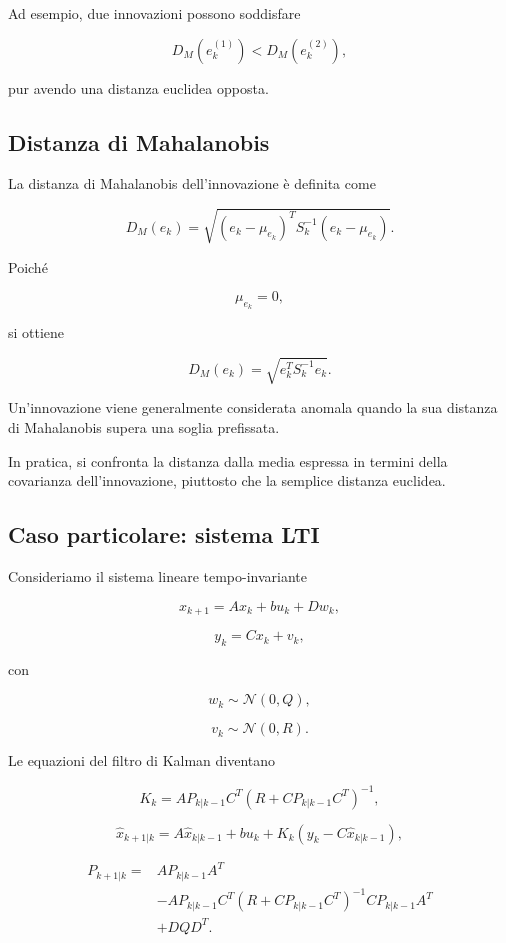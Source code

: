 \documentclass[11pt,a4paper]{article}
\begin{document}
Ad esempio, due innovazioni possono soddisfare

\[
D_M(e_k^{(1)})
<
D_M(e_k^{(2)}),
\]

pur avendo una distanza euclidea opposta.

\subsection*{Distanza di Mahalanobis}

La distanza di Mahalanobis dell'innovazione è definita come

\[
\boxed{
D_M(e_k)
=
\sqrt{
(e_k-\mu_{e_k})^T
S_k^{-1}
(e_k-\mu_{e_k})
}.
}
\]

Poiché

\[
\mu_{e_k}=0,
\]

si ottiene

\[
\boxed{
D_M(e_k)
=
\sqrt{
e_k^TS_k^{-1}e_k
}.
}
\]

Un'innovazione viene generalmente considerata anomala quando la sua distanza di Mahalanobis supera una soglia prefissata.

In pratica, si confronta la distanza dalla media espressa in termini della covarianza dell'innovazione, piuttosto che la semplice distanza euclidea.

\subsection*{Caso particolare: sistema LTI}

Consideriamo il sistema lineare tempo-invariante

\[
x_{k+1}=Ax_k+bu_k+Dw_k,
\]

\[
y_k=Cx_k+v_k,
\]

con

\[
w_k\sim\mathcal N(0,Q),
\]

\[
v_k\sim\mathcal N(0,R).
\]

Le equazioni del filtro di Kalman diventano

\[
\boxed{
K_k
=
AP_{k|k-1}C^T
\left(
R+CP_{k|k-1}C^T
\right)^{-1},
}
\]

\[
\boxed{
\hat{x}_{k+1|k}
=
A\hat{x}_{k|k-1}
+
bu_k
+
K_k
\left(
y_k-C\hat{x}_{k|k-1}
\right),
}
\]

\[
\boxed{
\begin{aligned}
P_{k+1|k}
=
&
AP_{k|k-1}A^T
\\
&
-
AP_{k|k-1}C^T
\left(
R+CP_{k|k-1}C^T
\right)^{-1}
CP_{k|k-1}A^T
\\
&
+
DQD^T.
\end{aligned}
}
\]
\end{document}

